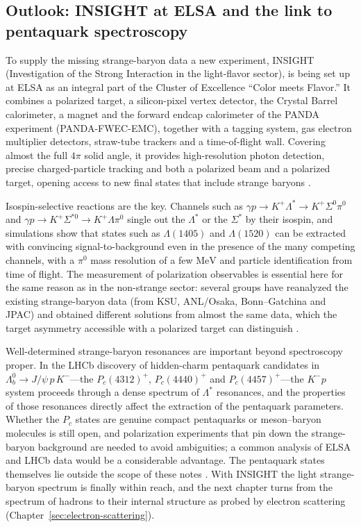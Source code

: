 \subsection{Outlook: INSIGHT at ELSA and the link to pentaquark spectroscopy}
\label{subsec:insight-outlook}

To supply the missing strange-baryon data a new experiment, INSIGHT (Investigation of the
Strong Interaction in the light-flavor sector), is being set up at ELSA as an integral part
of the Cluster of Excellence ``Color meets Flavor.'' It combines a polarized target, a
silicon-pixel vertex detector, the Crystal Barrel calorimeter, a magnet and the forward
endcap calorimeter of the PANDA experiment (PANDA-FWEC-EMC), together with a tagging
system, gas electron multiplier detectors, straw-tube trackers and a time-of-flight wall.
Covering almost the full $4\pi$ solid angle, it provides high-resolution photon detection,
precise charged-particle tracking and both a polarized beam and a polarized target, opening
access to new final states that include strange baryons \cite[Ch.~15]{Amsler2018}.

Isospin-selective reactions are the key. Channels such as
$\gamma p \to K^{+}\Lambda^{*} \to K^{+}\Sigma^0\pi^0$ and
$\gamma p \to K^{+}\Sigma^{*0} \to K^{+}\Lambda\pi^0$ single out the $\Lambda^{*}$ or the
$\Sigma^{*}$ by their isospin, and simulations show that states such as $\Lambda(1405)$ and
$\Lambda(1520)$ can be extracted with convincing signal-to-background even in the presence
of the many competing channels, with a $\pi^0$ mass resolution of a few $\mathrm{MeV}$ and
particle identification from time of flight. The measurement of polarization observables is
essential here for the same reason as in the non-strange sector: several groups have
reanalyzed the existing strange-baryon data (from KSU, ANL/Osaka, Bonn--Gatchina and JPAC)
and obtained different solutions from almost the same data, which the target asymmetry
accessible with a polarized target can distinguish \cite[Ch.~15]{Amsler2018}.

Well-determined strange-baryon resonances are important beyond spectroscopy proper. In the
LHCb discovery of hidden-charm pentaquark candidates in
$\Lambda_b^0 \to J/\psi\, p\, K^{-}$---the $P_c(4312)^+$, $P_c(4440)^+$ and
$P_c(4457)^+$---the $K^{-}p$ system proceeds through a dense spectrum of $\Lambda^{*}$
resonances, and the properties of those resonances directly affect the extraction of the
pentaquark parameters. Whether the $P_c$ states are genuine compact pentaquarks or
meson--baryon molecules is still open, and polarization experiments that pin down the
strange-baryon background are needed to avoid ambiguities; a common analysis of ELSA and
LHCb data would be a considerable advantage. The pentaquark states themselves lie outside the
scope of these notes \cite[Ch.~16]{Amsler2018}. With INSIGHT the light
strange-baryon spectrum is finally within reach, and the next chapter turns from the
spectrum of hadrons to their internal structure as probed by electron scattering
(Chapter~\ref{sec:electron-scattering}).

